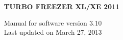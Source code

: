 \begin{titlepage}
\thispagestyle{empty}
\begin{center}
\vspace*{9cm}

{\Huge\bfseries\sffamily TURBO FREEZER XL/XE 2011}

\vspace{10cm}

Manual for software version 3.10\\
Last updated on March 27, 2013

\end{center}
\end{titlepage}

